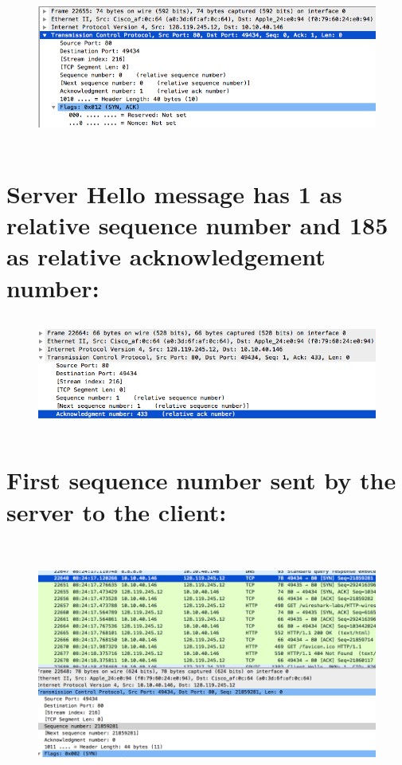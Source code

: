 \documentclass[]{report}
\begin{document}
\begin{figure}[H]
	\vspace{0pt}
	\includegraphics[height = 145pt, keepaspectratio]{Snapshots/q15.png}
\end{figure}

\section{Server Hello message has 1 as relative sequence number and 185 as relative acknowledgement number:}

\begin{figure}[H]
	\vspace{0pt}
	\includegraphics[height = 105pt, keepaspectratio]{Snapshots/q16.png}
\end{figure}

\section{First sequence number sent by the server to the client:}

\begin{figure}[H]
	\vspace{0pt}
	\includegraphics[height = 230pt, keepaspectratio]{Snapshots/q17.png}
\end{figure}
\end{document}
